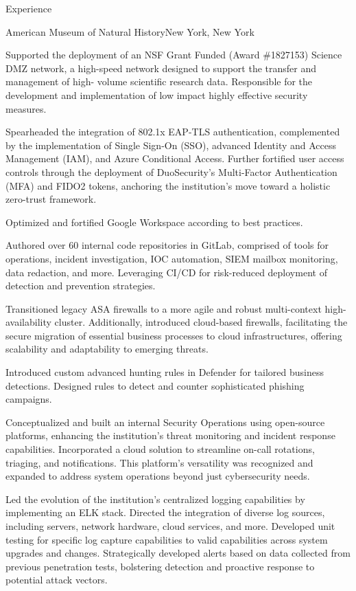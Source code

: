 \documentclass[]{mcdowellcv}
\begin{document}
\begin{cvsection}{Experience}
\begin{jobentry}{American Museum of Natural History}{New York, New York}
        \begin{jobprojects}
            \item Supported the deployment of an NSF Grant Funded (Award \#1827153) Science DMZ
    network, a high-speed network designed to support the transfer and management of high-
    volume scientific research data. Responsible for the development and implementation of
    low impact highly effective security measures.
            \item Spearheaded the integration of 802.1x EAP-TLS authentication, complemented by the implementation of Single Sign-On (SSO), advanced Identity and Access Management (IAM), and Azure Conditional Access. Further fortified user access controls through the deployment of DuoSecurity's Multi-Factor Authentication (MFA) and FIDO2 tokens, anchoring the institution's move toward a holistic zero-trust framework.
            \item Optimized and fortified Google Workspace according to best practices.
            \item Authored over 60 internal code repositories in GitLab, comprised of tools for operations, incident investigation, IOC automation, SIEM mailbox monitoring, data redaction, and more. Leveraging CI/CD for risk-reduced deployment of detection and prevention strategies.
            \item Transitioned legacy ASA firewalls to a more agile and robust multi-context high-availability cluster. Additionally, introduced cloud-based firewalls, facilitating the secure migration of essential business processes to cloud infrastructures, offering scalability and adaptability to emerging threats.
            \item Introduced custom advanced hunting rules in Defender for tailored business detections. Designed rules to detect and counter sophisticated phishing campaigns.
            \item Conceptualized and built an internal Security Operations using open-source platforms, enhancing the institution's threat monitoring and incident response capabilities. Incorporated a cloud solution to streamline on-call rotations, triaging, and notifications. This platform's versatility was recognized and expanded to address system operations beyond just cybersecurity needs.
            \item Led the evolution of the institution's centralized logging capabilities by implementing an ELK stack. Directed the integration of diverse log sources, including servers, network hardware, cloud services, and more. Developed unit testing for specific log capture capabilities to valid capabilities across system upgrades and changes. Strategically developed alerts based on data collected from previous penetration tests, bolstering detection and proactive response to potential attack vectors.

\end{jobprojects}
\end{jobentry}
\end{cvsection}
\end{document}
